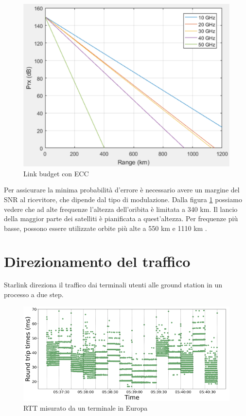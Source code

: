 \begin{figure}[htbp]
  \centering
  \includegraphics[width=0.8\linewidth]{./res/img/link_budget_w_ecc.png}
  \caption{Link budget con \ac{ECC}}
  \label{fig:link-budget-w-ecc}
\end{figure}

Per assicurare la minima probabilità d'errore è necessario avere un margine del \ac{SNR} al ricevitore, che dipende dal tipo di modulazione.
Dalla figura \ref{fig:link-budget-w-ecc} possiamo vedere che ad alte frequenze l'altezza dell'oribita è limitata a 340 km.
Il lancio della maggior parte dei satelliti è pianificata a quest'altezza.
Per frequenze più basse, possono essere utilizzate orbite più alte a 550 km e 1110 km \cite{rozenvasser_estimation_2023}.

\section{Direzionamento del traffico}
Starlink direziona il traffico dai terminali utenti alle ground station in un processo a due step.

\begin{figure}[htbp]
  \centering
  \includegraphics[width=0.8\linewidth]{./res/img/rtt_euterminal.png}
  \caption{\ac{RTT} misurato da un terminale in Europa \cite{tanveer_making_2023}}
  \label{fig:rtt-euterminal}
\end{figure}

